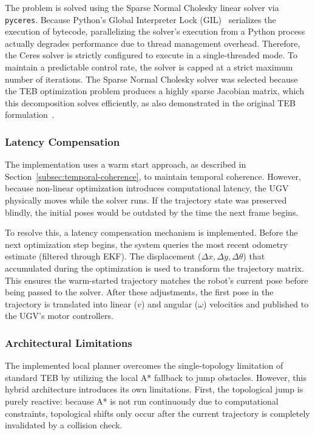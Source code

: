 The problem is solved using the Sparse Normal Cholesky linear solver via \texttt{pyceres}. Because Python's Global Interpreter Lock (GIL)~\cite{van2009python3} serializes the execution of bytecode, parallelizing the solver's execution from a Python process actually degrades performance due to thread management overhead. Therefore, the Ceres solver is strictly configured to execute in a single-threaded mode. 
To maintain a predictable control rate, the solver is capped at a strict maximum number of iterations. The Sparse Normal Cholesky solver was selected because the TEB optimization problem produces a highly sparse Jacobian matrix, which this decomposition solves efficiently, as also demonstrated in the original TEB formulation~\cite{rosmann2013sparse}.

\subsubsection{Latency Compensation}
\label{subsubsec:latency-compensation}
The implementation uses a warm start approach, as described in Section~\ref{subsec:temporal-coherence}, to maintain temporal coherence. However, because non-linear optimization introduces computational latency, the UGV physically moves while the solver runs. If the trajectory state was preserved blindly, the initial poses would be outdated by the time the next frame begins.

To resolve this, a latency compensation mechanism is implemented. Before the next optimization step begins, the system queries the most recent odometry estimate (filtered through EKF). The displacement ($\Delta x, \Delta y, \Delta \theta$) that accumulated during the optimization is used to transform the trajectory matrix. This ensures the warm-started trajectory matches the robot's current pose before being passed to the solver. After these adjustments, the first pose in the trajectory is translated into linear ($v$) and angular ($\omega$) velocities and published to the UGV's motor controllers.

\subsubsection{Architectural Limitations}
\label{subsubsec:planner-limitations}
The implemented local planner overcomes the single-topology limitation of standard TEB by utilizing the local A* fallback to jump obstacles. However, this hybrid architecture introduces its own limitations. First, the topological jump is purely reactive: because A* is not run continuously due to computational constraints, topological shifts only occur after the current trajectory is completely invalidated by a collision check.

